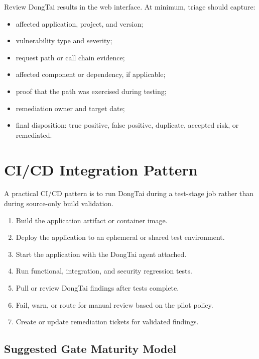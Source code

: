 \documentclass[11pt]{article}
\begin{document}
Review DongTai results in the web interface. At minimum, triage should capture:

\begin{itemize}
  \item affected application, project, and version;
  \item vulnerability type and severity;
  \item request path or call chain evidence;
  \item affected component or dependency, if applicable;
  \item proof that the path was exercised during testing;
  \item remediation owner and target date;
  \item final disposition: true positive, false positive, duplicate, accepted risk, or remediated.
\end{itemize}

\section{CI/CD Integration Pattern}

A practical CI/CD pattern is to run DongTai during a test-stage job rather than during source-only build validation.

\begin{enumerate}
  \item Build the application artifact or container image.
  \item Deploy the application to an ephemeral or shared test environment.
  \item Start the application with the DongTai agent attached.
  \item Run functional, integration, and security regression tests.
  \item Pull or review DongTai findings after tests complete.
  \item Fail, warn, or route for manual review based on the pilot policy.
  \item Create or update remediation tickets for validated findings.
\end{enumerate}

\subsection{Suggested Gate Maturity Model}
\end{document}

